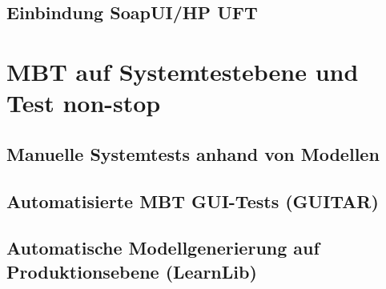 \subsection{Einbindung SoapUI/HP UFT}


\section{MBT auf Systemtestebene und Test non-stop}
\subsection{Manuelle Systemtests anhand von Modellen}
\subsection{Automatisierte MBT GUI-Tests (GUITAR)}
\subsection{Automatische Modellgenerierung auf Produktionsebene (LearnLib)}